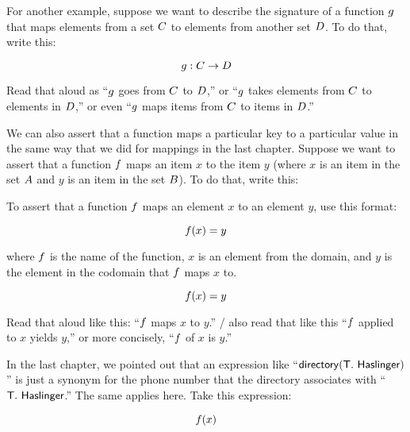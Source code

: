 \documentclass[../../../main.tex]{subfiles}
\begin{document}
For another example, suppose we want to describe the signature of a function $g$ that maps elements from a set $C$ to elements from another set $D$. To do that, write this:

\begin{equation*}
  g : C \rightarrow D
\end{equation*}

Read that aloud as ``$g$ goes from $C$ to $D$,'' or ``$g$ takes elements from $C$ to elements in $D$,'' or even ``$g$ maps items from $C$ to items in $D$.''

We can also assert that a function maps a particular key to a particular value in the same way that we did for mappings in the last chapter. Suppose we want to assert that a function $f$ maps an item $x$ to the item $y$ (where $x$ is an item in the set $A$ and $y$ is an item in the set $B$). To do that, write this:

\begin{aside}
  \begin{notation}
    To assert that a function $f$ maps an element $x$ to an element $y$, use this format:
    
    \begin{equation*}
      f(x) = y
    \end{equation*}
    
    where $f$ is the name of the function, $x$ is an element from the domain, and $y$ is the element in the codomain that $f$ maps $x$ to.
  \end{notation}
\end{aside}

\begin{equation*}
  f(x) = y
\end{equation*}

Read that aloud like this: ``$f$ maps $x$ to $y$.'' \Mathers/ also read that like this ``$f$ applied to $x$ yields $y$,'' or more concisely, ``$f$ of $x$ is $y$.''

In the last chapter, we pointed out that an expression like ``$\mathsf{directory(T.~Haslinger)}$'' is just a synonym for the phone number that the directory associates with ``$\mathsf{T.~Haslinger}$.'' The same applies here. Take this expression:

\begin{equation*}
  f(x)
\end{equation*}
\end{document}
